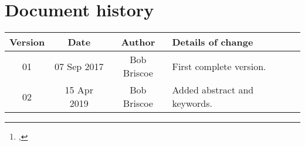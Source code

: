 \documentclass[a4paper,twoside,twocolumn]{article}
\title{\metatitle}%
\author{\metaauthori%
\thanks{\metamaili, %
\metaaddress}%
}
\date{\metadate}%
\newif\ifccs   %
\newcommand*{\metakeywords}{Data Communication, Networks, Internet, Control, Congestion Control, Quality of Service, Performance, Latency, Responsiveness, Dynamics, Algorithm, Standards, Active Queue Management, AQM, Signalling, Sojourn time, Queue delay, Service time, wait time, Expectation, Estimation, Explicit Congestion Notificiation, ECN}
\newcommand*{\metaversion}{02}
\newcommand*{\metadate}{15 Apr 2019}
\begin{document}
%


\maketitle%
\thispagestyle{first}

\begin{abstract}
{\small\noindent%
}      %
\end{abstract}
\ifccs{}%
%
%
\subsection*{CCS Concepts}
\textbf{\textbullet Networks} \(\to\) \textbf{Cross-layer protocols; Network algorithms; Network dynamics;}
\subsubsection*{Keywords}
\metakeywords
%
\fi{}%


{}

{\footnotesize%
}


\onecolumn%
\section*{Document history}

\begin{tabular}{|c|c|c|p{3.5in}|}
 \hline
Version &Date &Author &Details of change \\
\hline\hline
01                      &07 Sep 2017   &Bob Briscoe &First complete version.\\\hline%
\metaversion &\metadate     &Bob Briscoe &Added abstract and keywords.\\\hline%
\hline%
\end{tabular}
\end{document}
